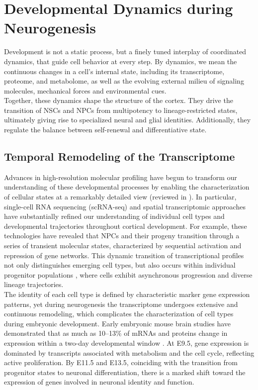 \section{Developmental Dynamics during Neurogenesis}
Development is not a static process, but a finely tuned interplay of coordinated dynamics, that guide cell behavior at every step. By dynamics, we mean the continuous changes in a cell’s internal state, including its transcriptome, proteome, and metabolome, as well as the evolving external milieu of signaling molecules, mechanical forces and environmental cues.
\\

Together, these dynamics shape the structure of the cortex. They drive the transition of NSCs and NPCs from multipotency to lineage-restricted states, ultimately giving rise to specialized neural and glial identities. Additionally, they regulate the balance between self-renewal and differentiative state.

\subsection{Temporal Remodeling of the Transcriptome}
Advances in high-resolution molecular profiling have begun to transform our understanding of these developmental processes by enabling the characterization of cellular states at a remarkably detailed view (reviewed in \citep{BRISCOELookingNeurodevelopmentBig2020}).  In particular, single-cell RNA sequencing (\gls{scRNA-seq})
and spatial transcriptomic approaches have substantially refined our understanding of individual cell types and developmental trajectories throughout cortical development. For example, these technologies have revealed that NPCs and their progeny transition through a series of transient molecular states, characterized by sequential activation and repression of gene networks. This dynamic transition of transcriptional profiles not only distinguishes emerging cell types, but also occurs within individual progenitor populations \citep{RUANProgenitorCellDiversity2021}, where cells exhibit asynchronous progression and diverse lineage trajectories. 
\\

The identity of each cell type is defined by characteristic marker gene expression patterns, yet during neurogenesis the transcriptome undergoes extensive and continuous remodeling, which complicates the characterization of cell types during embryonic development. Early embryonic mouse brain studies have demonstrated that as much as 10–13\% of mRNAs and proteins
change in expression within a two-day developmental window \citep{HARTLTranscriptomeProteomeAnalysis2008}. At E9.5, gene expression is dominated by transcripts associated with metabolism and the cell cycle, reflecting active proliferation. By E11.5 and E13.5, coinciding with the transition from progenitor states to neuronal differentiation, there is a marked shift toward the expression of genes involved in neuronal identity and function.
\\

